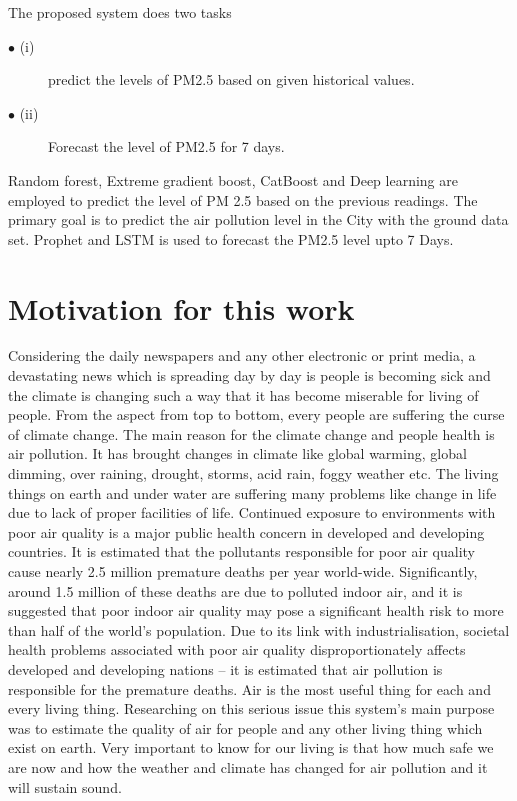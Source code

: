 The proposed system does two tasks
\begin{description}
  \item[$\bullet$ (i)]  predict the levels of PM2.5 based on given historical values.
  \item[$\bullet$ (ii)]   Forecast the level of PM2.5 for 7 days.
\end{description}
Random forest, Extreme gradient boost, CatBoost
and Deep learning are employed to predict the
level of PM 2.5 based on the previous readings.
The primary goal is to predict the air pollution
level in the City with the ground data set.
Prophet and LSTM is used to forecast the PM2.5 level upto 7 Days.


\section{Motivation for this work}

Considering the daily newspapers and any other electronic or print media, a devastating
news which is spreading day by day is people is becoming sick and the climate is changing such
a way that it has become miserable for living of people. From the aspect from top to bottom,
every people are suffering the curse of climate change. The main reason for the climate change
and people health is air pollution. It has brought changes in climate like global warming, global
dimming, over raining, drought, storms, acid rain, foggy weather etc. The living things on earth
and under water are suffering many problems like change in life due to lack of proper facilities
of life. 
Continued exposure to environments with poor air quality is a major public health concern in
developed and developing countries. It is estimated that the pollutants responsible for poor air
quality cause nearly 2.5 million premature deaths per year world-wide. Significantly, around 1.5
million of these deaths are due to polluted indoor air, and it is suggested that poor indoor air
quality may pose a significant health risk to more than half of the world’s population. Due to its
link with industrialisation, societal health problems associated with poor air quality
disproportionately affects developed and developing nations – it is estimated that air pollution is
responsible for the premature deaths. 
Air is the most useful thing for each and every living thing. Researching on this serious
issue this system’s main purpose was to estimate the quality of air for people and any other
living thing which exist on earth. Very important to know for our living is that how much safe
we are now and how the weather and climate has changed for air pollution and it will sustain
sound. \

